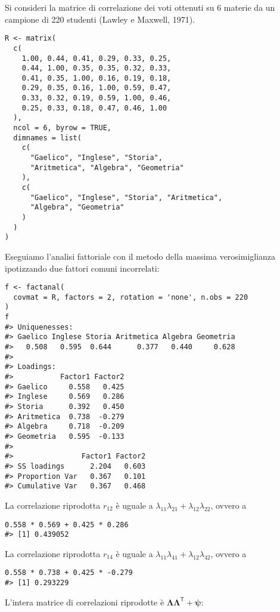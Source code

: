 
\begin{exmp}

Si consideri la matrice di correlazione dei voti ottenuti su 6 materie da un  campione di 220 studenti (Lawley e Maxwell, 1971).
  
\begin{lstlisting}
R <- matrix(
  c(
    1.00, 0.44, 0.41, 0.29, 0.33, 0.25,
    0.44, 1.00, 0.35, 0.35, 0.32, 0.33,
    0.41, 0.35, 1.00, 0.16, 0.19, 0.18,
    0.29, 0.35, 0.16, 1.00, 0.59, 0.47,
    0.33, 0.32, 0.19, 0.59, 1.00, 0.46,
    0.25, 0.33, 0.18, 0.47, 0.46, 1.00
  ),
  ncol = 6, byrow = TRUE,
  dimnames = list(
    c(
      "Gaelico", "Inglese", "Storia",
      "Aritmetica", "Algebra", "Geometria"
    ),
    c(
      "Gaelico", "Inglese", "Storia", "Aritmetica",
      "Algebra", "Geometria"
    )
  )
)
\end{lstlisting}
Eseguiamo l'analisi fattoriale con il metodo della massima
verosimiglianza ipotizzando due fattori comuni incorrelati:
\begin{lstlisting}
f <- factanal(
  covmat = R, factors = 2, rotation = 'none', n.obs = 220
)
f
#> Uniquenesses:
#> Gaelico Inglese Storia Aritmetica Algebra Geometria 
#>   0.508   0.595  0.644      0.377   0.440     0.628 
#> 
#> Loadings:
#>           Factor1 Factor2
#> Gaelico     0.558   0.425 
#> Inglese     0.569   0.286 
#> Storia      0.392   0.450 
#> Aritmetica  0.738  -0.279 
#> Algebra     0.718  -0.209 
#> Geometria   0.595  -0.133 
#> 
#>                Factor1 Factor2
#> SS loadings      2.204   0.603
#> Proportion Var   0.367   0.101
#> Cumulative Var   0.367   0.468
\end{lstlisting}
La correlazione riprodotta $r_{12}$ è uguale a $\lambda_{11}\lambda_{21} + \lambda_{12}\lambda_{22}$, ovvero a
\begin{lstlisting}
0.558 * 0.569 + 0.425 * 0.286
#> [1] 0.439052
\end{lstlisting}
La correlazione riprodotta $r_{14}$ è uguale a $\lambda_{11}\lambda_{41} + \lambda_{12}\lambda_{42}$, ovvero a
\begin{lstlisting}
0.558 * 0.738 + 0.425 * -0.279
#> [1] 0.293229
\end{lstlisting}
L'intera matrice di correlazioni riprodotte è $\boldsymbol{\Lambda} \boldsymbol{\Lambda}^{\ensuremath{\mathsf{T}}} + \boldsymbol{\psi}$:



\end{exmp}
